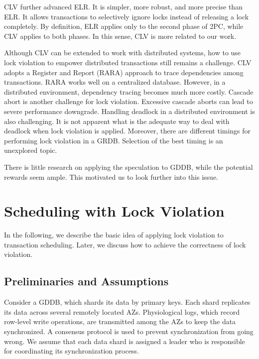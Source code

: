 \documentclass[conference]{IEEEtran}
\begin{document}
\begin{highlighted}

CLV further advanced ELR. 
It is simpler, more robust, and more precise than ELR.
It allows transactions to selectively ignore locks instead of releasing a lock completely.
By definition, ELR  applies only to the second phase of 2PC, while CLV applies to both phases.
In this sense, CLV is more related to our work.

Although CLV can be extended to work with distributed systems, 
how to use lock violation to empower distributed transactions still remains a challenge.
CLV adopts a Register and Report (RARA) approach \cite{HeckatonMVCC:journals/pvldb/LarsonBDFPZ11} to trace dependencies among transactions.
RARA works well on a centralized database. 
However, in a distributed environment, dependency tracing becomes much more costly.
Cascade abort is another challenge for lock violation. 
Excessive cascade aborts can lead to severe performance downgrade.
Handling deadlock in a distributed environment is also challenging. It is not apparent what is the adequate way to deal with deadlock when lock violation is applied.
Moreover, there are different timings for performing lock violation in a GRDB. Selection of the best timing is an unexplored topic.
 
\end{highlighted}

There is little research on applying the speculation to GDDB, while the potential rewards seem ample. This motivated us to look further into this issue.


\section{Scheduling with Lock Violation}
\label{sec:non_strict}

In the following, we describe the basic idea of applying lock violation to transaction scheduling.
Later, we discuss how to achieve the correctness of lock violation.

\subsection{Preliminaries and Assumptions}
Consider a GDDB, which shards its data by primary keys.
Each shard replicates its data across several remotely located AZs.
Physiological logs, which record row-level write operations, are transmitted among the AZs to keep the data synchronized.
A consensus protocol is used to prevent synchronization from going wrong.
We assume that each data shard is assigned a leader who is responsible for coordinating its synchronization process.
\end{document}
